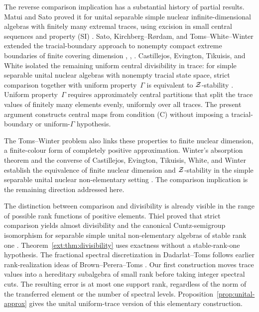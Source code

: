 The reverse comparison implication has a substantial history of
partial results. Matui and Sato proved it for unital separable simple
nuclear infinite-dimensional algebras with finitely many extremal
traces, using excision in small central sequences and property
\textup{(SI)} \cite[Theorem~1.1]{MatuiSato2012}.
Sato, Kirchberg--R\o rdam, and Toms--White--Winter extended the
tracial-boundary approach to nonempty compact extreme boundaries of
finite covering dimension \cite[Corollary~1.2]{Sato2012},
\cite[Corollary~7.9]{KirchbergRordam2014},
\cite[Corollary~4.7]{TWW2015}.
Castillejos, Evington, Tikuisis, and White isolated the remaining
uniform central divisibility in trace: for simple separable unital
nuclear algebras with nonempty tracial state space, strict comparison
together with uniform property~$\Gamma$ is equivalent to
$\mathcal Z$-stability \cite[Theorem~5.6]{CETW2022}. Uniform property~$\Gamma$
requires approximately central partitions that split the trace values
of finitely many elements evenly, uniformly over all traces.
The present argument constructs
central maps from condition \textup{(C)} without imposing a
tracial-boundary or uniform-$\Gamma$ hypothesis.

The Toms--Winter problem also links these properties to finite nuclear
dimension, a finite-colour form of completely positive approximation.
Winter's absorption theorem and the converse of Castillejos, Evington,
Tikuisis, White, and Winter establish the equivalence of finite nuclear
dimension and $\mathcal Z$-stability in the simple separable unital nuclear
non-elementary setting \cite[Corollary~6.3]{Winter2012}
\cite[Theorem~A]{CETWW2021}. The comparison implication is the
remaining direction addressed here.

The distinction between comparison and divisibility is already
visible in the range of possible rank functions of positive elements.
Thiel proved that strict comparison yields almost divisibility and
the canonical Cuntz-semigroup isomorphism for separable simple unital
non-elementary algebras of stable rank one
\cite[Corollary~8.12]{Thiel2020}. Theorem~\ref{ext:thm:divisibility}
uses exactness without a stable-rank-one hypothesis.
The fractional spectral discretization in Dadarlat--Toms
\cite[Theorem~5.1 and its proof]{DadarlatToms2010} follows earlier
rank-realization ideas of Brown--Perera--Toms \cite[Section~5]{BPT2008}.
Our first construction moves trace values
into a hereditary subalgebra of small rank before taking integer
spectral cuts. The resulting error is at most one support rank,
regardless of the norm of the transferred element or the number of
spectral levels. Proposition~\ref{prop:unital-approx} gives the unital
uniform-trace version of this elementary construction.

